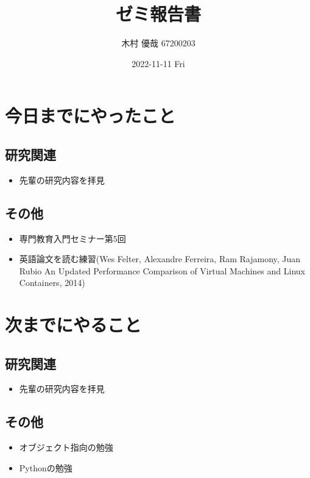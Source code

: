 \documentclass[uplatex, onecolumn, 10pt]{jsarticle}
\begin{document}
\title{\vspace{-40mm}\bf{\LARGE{ゼミ報告書}}}
\author{\vspace{-40mm}木村 優哉 67200203}
\date{2022-11-11 Fri}
\maketitle


\section{今日までにやったこと}

\subsection*{研究関連} 
\begin{itemize}
	\item 先輩の研究内容を拝見
\end{itemize}

\subsection*{その他}
\begin{itemize}
	\item 専門教育入門セミナー第5回
	\item 英語論文を読む練習(Wes Felter, Alexandre Ferreira, Ram Rajamony, Juan Rubio 
	An Updated Performance Comparison of Virtual Machines and Linux Containers, 2014)
\end{itemize}


\section{次までにやること}

\subsection*{研究関連} 
\begin{itemize}
	\item 先輩の研究内容を拝見
\end{itemize}

\subsection*{その他}
\begin{itemize}
	\item オブジェクト指向の勉強
	\item Pythonの勉強
\end{itemize}
\end{document}
